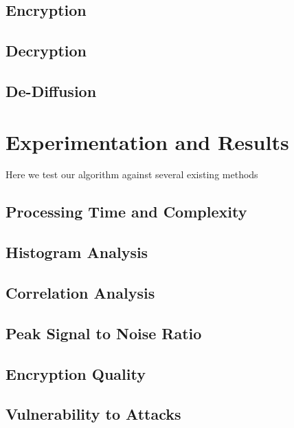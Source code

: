 \documentclass[conference]{IEEEtran}
\begin{document}
\subsection{Encryption}\label{subsec:encryption}

\subsection{Decryption}\label{subsec:decryption}

\subsection{De-Diffusion}\label{subsec:de-diffusion}

\section{Experimentation and Results}\label{sec:experimentation-and-results}

Here we test our algorithm against several existing methods

\subsection{Processing Time and Complexity}\label{subsec:processing-time-and-complexity}

\subsection{Histogram Analysis}\label{subsec:histogram-analysis}

\subsection{Correlation Analysis}\label{subsec:correlation-analysis}

\subsection{Peak Signal to Noise Ratio}\label{subsec:peak-signal-to-noise-ratio}

\subsection{Encryption Quality}\label{subsec:encryption-quality}

\subsection{Vulnerability to Attacks}\label{subsec:vulnerability-to-attacks}
\end{document}
